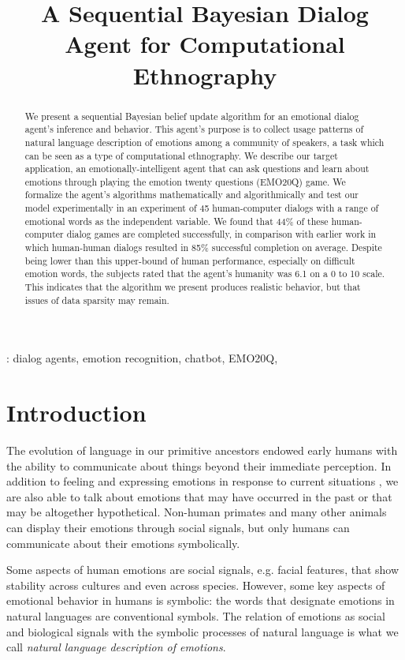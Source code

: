 \documentclass[a4paper]{article}
\title{A Sequential Bayesian Dialog Agent for Computational Ethnography}
\begin{document}
\maketitle


\begin{abstract}
{%
We present a sequential Bayesian belief update algorithm for an emotional
dialog agent's inference and behavior.  This agent's purpose is to collect
usage patterns of natural language description of emotions among a community
of speakers, a task which can be seen as a type of computational ethnography.
We describe our target application, an emotionally-intelligent agent that can
ask questions and learn about emotions through playing the emotion twenty
questions (EMO20Q) game.  We formalize the agent's algorithms mathematically
and algorithmically and test our model experimentally in an experiment of 45
human-computer dialogs with a range of emotional words as the independent
variable. We found that 44\% of these human-computer dialog games are
completed successfully, in comparison with earlier work in which human-human
dialogs resulted in 85\% successful completion on average.  Despite being
lower than this upper-bound of human performance, especially on difficult
emotion words, the subjects rated that the agent's humanity was 6.1 on a 0 to
10 scale. This indicates that the algorithm we present produces realistic
behavior, but that issues of data sparsity may remain.
}
\end{abstract}
: dialog agents, emotion recognition, chatbot,
EMO20Q, 


\section{Introduction}

The evolution of language in our primitive ancestors endowed early humans with
the ability to communicate about things beyond their immediate perception. In
addition to feeling and expressing emotions in response to current situations
\cite{Marsella2009}, we are also able to talk about emotions that may have
occurred in the past or that may be altogether hypothetical.  Non-human
primates and many other animals can display their emotions through social
signals, but only humans can communicate about their emotions symbolically.

Some aspects of human emotions are social signals, e.g. facial features, that
show stability across cultures and even across species.  However, some key
aspects of emotional behavior in humans is symbolic: the words that designate
emotions in natural languages are conventional symbols.  The relation of
emotions as social and biological signals with the symbolic processes of
natural language is what we call {\em natural language description of emotions}.
\end{document}
